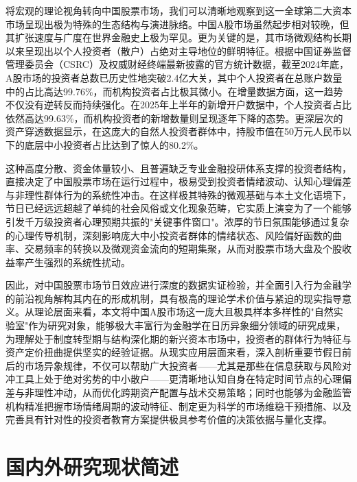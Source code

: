 \documentclass{cupb-thesis}
\begin{document}
将宏观的理论视角转向中国股票市场，我们可以清晰地观察到这一全球第二大资本市场呈现出极为特殊的生态结构与演进脉络。中国A股市场虽然起步相对较晚，但其扩张速度与广度在世界金融史上极为罕见。更为关键的是，其市场微观结构长期以来呈现出以个人投资者（散户）占绝对主导地位的鲜明特征。根据中国证券监督管理委员会（CSRC）及权威财经终端最新披露的官方统计数据，截至2024年底，A股市场的投资者总数已历史性地突破2.4亿大关，其中个人投资者在总账户数量中的占比高达99.76\%，而机构投资者占比极其微小。在增量数据方面，这一趋势不仅没有逆转反而持续强化。在2025年上半年的新增开户数据中，个人投资者占比依然高达99.63\%，而机构投资者的新增数量则呈现逐年下降的态势。更深层次的资产穿透数据显示，在这庞大的自然人投资者群体中，持股市值在50万元人民币以下的底层中小投资者占比达到了惊人的80.2\%。


这种高度分散、资金体量较小、且普遍缺乏专业金融投研体系支撑的投资者结构，直接决定了中国股票市场在运行过程中，极易受到投资者情绪波动、认知心理偏差与非理性群体行为的系统性冲击。在这样极其特殊的微观基础与本土文化语境下，节日已经远远超越了单纯的社会风俗或文化现象范畴，它实质上演变为了一个能够引发千万级投资者心理预期共振的"关键事件窗口"。浓厚的节日氛围能够通过复杂的心理传导机制，深刻影响庞大中小投资者群体的情绪状态、风险偏好函数的曲率、交易频率的转换以及微观资金流向的短期集聚，从而对股票市场大盘及个股收益率产生强烈的系统性扰动。


因此，对中国股票市场节日效应进行深度的数据实证检验，并全面引入行为金融学的前沿视角解构其内在的形成机制，具有极高的理论学术价值与紧迫的现实指导意义。从理论层面来看，本文将中国A股市场这一庞大且极具样本多样性的"自然实验室"作为研究对象，能够极大丰富行为金融学在日历异象细分领域的研究成果，为理解处于制度转型期与结构深化期的新兴资本市场中，投资者的群体行为特征与资产定价扭曲提供坚实的经验证据。从现实应用层面来看，深入剖析重要节假日前后的市场异象规律，不仅可以帮助广大投资者——尤其是那些在信息获取与风险对冲工具上处于绝对劣势的中小散户——更清晰地认知自身在特定时间节点的心理偏差与非理性冲动，从而优化跨期资产配置与战术交易策略；同时也能够为金融监管机构精准把握市场情绪周期的波动特征、制定更为科学的市场维稳干预措施、以及完善具有针对性的投资者教育方案提供极具参考价值的决策依据与量化支撑。


\section{国内外研究现状简述}
\end{document}
